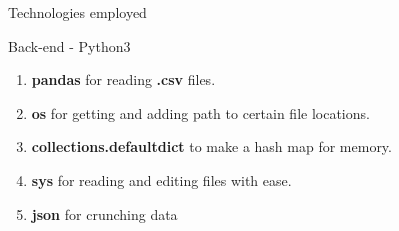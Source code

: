 \documentclass{article}
\begin{document}
\newpage
\begin{centering}
\begin{Huge}
\begin{bf}
\vspace{2.0cm}
\textsf{Technologies employed}\\
\end{bf}
\end{Huge}
\end{centering}
\protect\vspace{2.0cm}
\textbf{}
\huge
Back-end - Python3
\begin{enumerate}
  \item {\bf pandas} for reading {\bf .csv} files.
  \item {\bf os} for getting and adding path to certain file locations.
  \item {\bf collections.defaultdict} to make a hash map for memory.
  \item {\bf sys} for reading and editing files with ease.
  \item {\bf json} for crunching data
\end{enumerate}\\
\textbf{}
\end{document}

